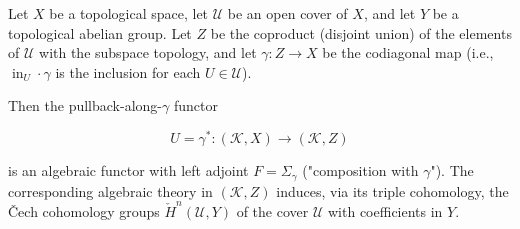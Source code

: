 Let $X$ be a topological space, let $\mathcal{U}$ be an open cover of $X$, and let $Y$ be a topological abelian group. Let $Z$ be the coproduct (disjoint union) of the elements of $\mathcal{U}$ with the subspace topology, and let $\gamma: Z \rightarrow X$ be the codiagonal map (i.e., $\operatorname{in}_U \cdot \gamma$ is the inclusion for each $U \in \mathcal{U}$).

Then the pullback-along-$\gamma$ functor

$$U = \gamma^*: (\mathcal{K}, X) \rightarrow (\mathcal{K}, Z)$$

is an algebraic functor with left adjoint $F = \Sigma_\gamma$ ("composition with $\gamma$"). The corresponding algebraic theory in $(\mathcal{K}, Z)$ induces, via its triple cohomology, the Čech cohomology groups $\check{H}^n(\mathcal{U}, Y)$ of the cover $\mathcal{U}$ with coefficients in $Y$.
